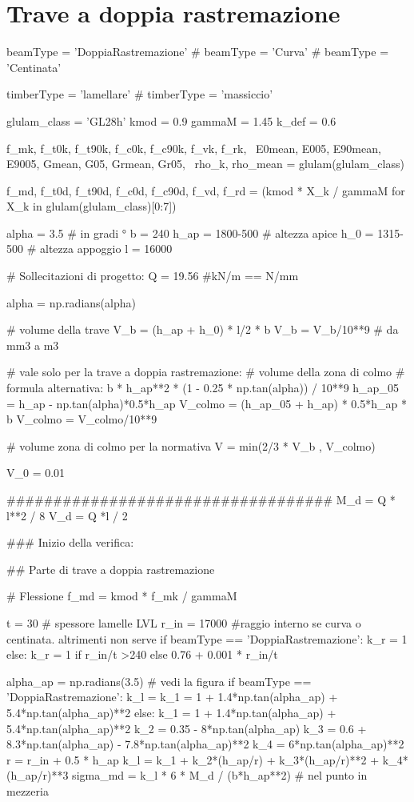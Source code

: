 \section{Trave a doppia rastremazione}
\begin{pycode}[TraveDoppiaRastremazione]
beamType = 'DoppiaRastremazione'
# beamType = 'Curva'
# beamType = 'Centinata'

timberType = 'lamellare'
# timberType = 'massiccio'

glulam_class = 'GL28h'
kmod = 0.9
gammaM = 1.45
k_def = 0.6

f_mk, f_t0k, f_t90k, f_c0k, f_c90k, f_vk, f_rk, \
E0mean, E005, E90mean, E9005, Gmean, G05, Grmean, Gr05, \
rho_k, rho_mean = glulam(glulam_class)

f_md, f_t0d, f_t90d, f_c0d, f_c90d, f_vd, f_rd = (kmod * X_k / gammaM for X_k in glulam(glulam_class)[0:7])

alpha = 3.5 # in gradi °
b = 240
h_ap = 1800-500 # altezza apice
h_0 = 1315-500 # altezza appoggio
l = 16000 

# Sollecitazioni di progetto:
Q = 19.56 #kN/m == N/mm

alpha = np.radians(alpha)

# volume della trave 
V_b = (h_ap + h_0) * l/2 * b 
V_b = V_b/10**9 # da mm3 a m3

# vale solo per la trave a doppia rastremazione:
# volume della zona di colmo
# formula alternativa: b * h_ap**2 * (1 - 0.25 * np.tan(alpha)) / 10**9
h_ap_05 = h_ap - np.tan(alpha)*0.5*h_ap
V_colmo =  (h_ap_05 + h_ap) * 0.5*h_ap * b
V_colmo = V_colmo/10**9

# volume zona di colmo per la normativa
V = min(2/3 * V_b , V_colmo)

V_0 = 0.01


###################################
M_d = Q * l**2 / 8
V_d = Q *l / 2

### Inizio della verifica:

## Parte di trave a doppia rastremazione

# Flessione
f_md = kmod * f_mk / gammaM

t = 30 # spessore lamelle LVL
r_in = 17000 #raggio interno se curva o centinata. altrimenti non serve
if beamType == 'DoppiaRastremazione':
    k_r = 1
else:
    k_r = 1 if r_in/t >240 else 0.76 + 0.001 * r_in/t

alpha_ap = np.radians(3.5) # vedi la figura
if beamType == 'DoppiaRastremazione':
    k_l = k_1 = 1 + 1.4*np.tan(alpha_ap) + 5.4*np.tan(alpha_ap)**2
else:
    k_1 = 1 + 1.4*np.tan(alpha_ap) + 5.4*np.tan(alpha_ap)**2
    k_2 = 0.35 - 8*np.tan(alpha_ap)
    k_3 = 0.6 + 8.3*np.tan(alpha_ap) - 7.8*np.tan(alpha_ap)**2
    k_4 = 6*np.tan(alpha_ap)**2
    r = r_in + 0.5 * h_ap
    k_l = k_1 + k_2*(h_ap/r) + k_3*(h_ap/r)**2 + k_4*(h_ap/r)**3
sigma_md = k_l * 6 * M_d / (b*h_ap**2) # nel punto in mezzeria


\end{pycode}

